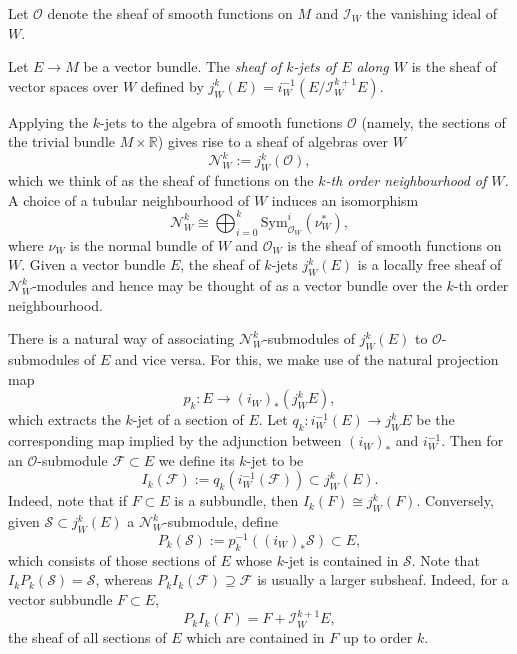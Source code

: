 \documentclass[10pt]{amsart}
\newcommand{\rr}{\mathbb{R}}
\newcommand{\N}{\mathcal{N}}
\numberwithin{theoremalpha}{section}
\numberwithin{equation}{section}
\numberwithin{definition}{section}
\numberwithin{theorem}{section}
\numberwithin{proposition}{section}
\numberwithin{lemma}{section}
\numberwithin{example}{section}
\numberwithin{remark}{section}
\numberwithin{corollary}{section}
\numberwithin{question}{section}
\numberwithin{problem}{section}
\numberwithin{assumption}{section}
\theoremstyle{named}
\numberwithin{equation}{section}
\begin{document}
Let $\mathcal{O}$ denote the sheaf of smooth functions on $M$ and $\mathcal{I}_W$ the vanishing ideal of $W$. 

\begin{definition}
Let $E \to M$ be a vector bundle. The \emph{sheaf of $k$-jets of $E$ along $W$} is the sheaf of vector spaces over $W$ defined by $j_{W}^{k}(E) = i_{W}^{-1}(E/\mathcal{I}_W^{k+1}E). $
\end{definition}

Applying the $k$-jets to the algebra of smooth functions $\mathcal{O}$ (namely, the sections of the trivial bundle $M \times \rr $) gives rise to a sheaf of algebras over $W$
\[
\mathcal{N}_{W}^{k} := j_{W}^{k}(\mathcal{O}),
\]
which we think of as the sheaf of functions on the \emph{$k$-th order neighbourhood of $W$.} A choice of a tubular neighbourhood of $W$ induces an isomorphism 
\begin{equation} \label{nbhdnormalform}
\mathcal{N}_{W}^{k} \cong \bigoplus_{i = 0}^{k} \mathrm{Sym}_{\mathcal{O}_{W}}^{i}(\nu_{W}^{*}), 
\end{equation}
where $\nu_{W}$ is the normal bundle of $W$ and $\mathcal{O}_{W}$ is the sheaf of smooth functions on $W$. Given a vector bundle $E$, the sheaf of $k$-jets $j_{W}^{k}(E)$ is a locally free sheaf of $\mathcal{N}_{W}^{k}$-modules and hence may be thought of as a vector bundle over the $k$-th order neighbourhood. 




There is a natural way of associating $\mathcal{N}^{k}_{W}$-submodules of $j_{W}^{k}(E)$ to $\mathcal{O}$-submodules of $E$ and vice versa. For this, we make use of the natural projection map 
\begin{equation*}
p_{k} : E \to (i_{W})_{*}(j_{W}^{k}E),
\end{equation*}
which extracts the $k$-jet of a section of $E$. Let $q_{k} : i_{W}^{-1}(E) \to j_{W}^{k}E$ be the corresponding map implied by the adjunction between $(i_W)_*$ and $i_{W}^{-1}$.  Then for an $\mathcal{O}$-submodule $\mathcal{F} \subset E$ we define its $k$-jet to be
\[
I_{k}(\mathcal{F}) := q_{k}(i_{W}^{-1}(\mathcal{F})) \subset j_{W}^{k}(E).
\]
Indeed, note that if $F \subset E$ is a subbundle, then $I_{k}(F) \cong j_{W}^{k}(F)$. Conversely, given $\mathcal{S} \subset j_{W}^{k}(E)$ a $\N^k_W$-submodule, define 
\[
P_{k}(\mathcal{S}) := p_{k}^{-1}( (i_{W})_{*} \mathcal{S}) \subset E, 
\] 
which consists of those sections of $E$ whose $k$-jet is contained in $\mathcal{S}$. Note that $I_{k}P_{k}(\mathcal{S}) = \mathcal{S}$, whereas $P_{k} I_{k}(\mathcal{F}) \supseteq \mathcal{F}$ is usually a larger subsheaf. Indeed, for a vector subbundle $F \subset E$, 
\begin{equation}\label{eq:tandescription}
P_{k}I_{k}(F) = F + \mathcal{I}_W^{k+1}E,
\end{equation}
the sheaf of all sections of $E$ which are contained in $F$ up to order $k$. 
\end{document}
